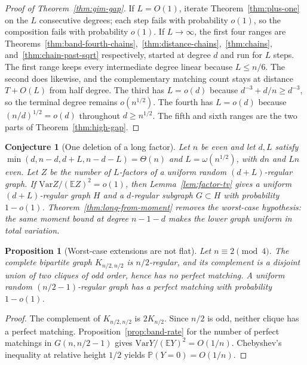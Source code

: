 \documentclass[11pt]{article}
\newtheorem{proposition}[theorem]{Proposition}
\newtheorem{conjecture}[theorem]{Conjecture}
\newcommand{\EE}{\mathbb{E}}
\newcommand{\PP}{\mathbb{P}}
\newcommand{\Var}{\mathrm{Var}}
\begin{document}
\begin{proof}[Proof of Theorem~\ref{thm:gim-gap}]
If \(L=O(1)\), iterate Theorem~\ref{thm:plus-one} on the \(L\) consecutive degrees; each step fails with probability \(o(1)\), so the composition fails with probability \(o(1)\).
If \(L\to\infty\), the first four ranges are Theorems~\ref{thm:band-fourth-chains},~\ref{thm:distance-chains},~\ref{thm:chains}, and~\ref{thm:chain-past-sqrt} respectively, started at degree \(d\) and run for \(L\) steps.
The first range keeps every intermediate degree linear because \(L\le n/6\).
The second does likewise, and the complementary matching count stays at distance \(T+O(L)\) from half degree.
The third has \(L=o(d)\) because \(d^{-3}+d/n\ge d^{-3}\), so the terminal degree remains \(o(n^{1/2})\).
The fourth has \(L=o(d)\) because \((n/d)^{1/2}=o(d)\) throughout \(d\ge n^{1/2}\).
The fifth and sixth ranges are the two parts of Theorem~\ref{thm:high-gap}.
\end{proof}

\begin{conjecture}[One deletion of a long factor]
\label{conj:long-step}
Let \(n\) be even and let \(d,L\) satisfy \(\min(d,n-d,d+L,n-d-L)=\Theta(n)\) and \(L=\omega(n^{1/2})\), with \(dn\) and \(Ln\) even.
Let \(Z\) be the number of \(L\)-factors of a uniform random \((d+L)\)-regular graph.
If \(\Var Z/(\EE Z)^2=o(1)\), then Lemma~\ref{lem:factor-tv} gives a uniform \((d+L)\)-regular graph \(H\) and a \(d\)-regular subgraph \(G\subset H\) with probability \(1-o(1)\).
Theorem~\ref{thm:long-from-moment} removes the worst-case hypothesis: the same moment bound at degree \(n-1-d\) makes the lower graph uniform in total variation.
\end{conjecture}

\begin{proposition}[Worst-case extensions are not flat]
\label{prop:not-flat}
Let \(n\equiv 2\pmod{4}\). The complete bipartite graph \(K_{n/2,n/2}\) is \(n/2\)-regular, and its complement is a disjoint union of two cliques of odd order, hence has no perfect matching.
A uniform random \((n/2-1)\)-regular graph has a perfect matching with probability \(1-o(1)\).
\end{proposition}

\begin{proof}
The complement of \(K_{n/2,n/2}\) is \(2K_{n/2}\). Since \(n/2\) is odd, neither clique has a perfect matching.
Proposition~\ref{prop:band-rate} for the number of perfect matchings in \(G(n,n/2-1)\) gives \(\Var Y/(\EE Y)^2=O(1/n)\).
Chebyshev's inequality at relative height \(1/2\) yields \(\PP(Y=0)=O(1/n)\).
\end{proof}
\end{document}
